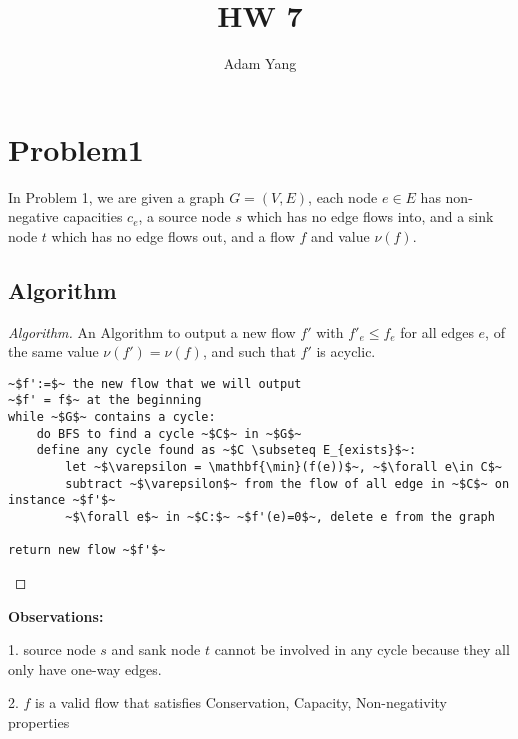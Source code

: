 \documentclass[openany]{article}
\begin{document}
\title{HW 7}
\author{Adam Yang}
\maketitle




\section*{Problem1}

In Problem 1, we are given a graph $G=(V,E)$, each node $e\in E$ has non-negative capacities $c_e$, a source node $s$ which has no edge flows into, and a sink node $t$ which has no edge flows out, and a flow $f$ and value $\nu(f)$.

\subsection*{Algorithm}
\begin{proof}[Algorithm]{}
		\renewcommand{\qedsymbol}{}
		An Algorithm to output a new flow $f'$ with $f'_e \leq f_e$ for all edges $e$, of the same value $\nu(f') = \nu(f)$, and such that $f'$ is acyclic.
		\begin{lstlisting}[basicstyle=\fontsize{8}{9}\selectfont\ttfamily]
~$f':=$~ the new flow that we will output
~$f' = f$~ at the beginning
while ~$G$~ contains a cycle:
    do BFS to find a cycle ~$C$~ in ~$G$~
    define any cycle found as ~$C \subseteq E_{exists}$~:
        let ~$\varepsilon = \mathbf{\min}(f(e))$~, ~$\forall e\in C$~
        subtract ~$\varepsilon$~ from the flow of all edge in ~$C$~ on instance ~$f'$~
        ~$\forall e$~ in ~$C:$~ ~$f'(e)=0$~, delete e from the graph

return new flow ~$f'$~
		\end{lstlisting} 
\end{proof}

\textbf{Observations:}

1. source node $s$ and sank node $t$ cannot be involved in any cycle because they all only have one-way edges.

2. $f$ is a valid flow that satisfies Conservation, Capacity, Non-negativity properties
\end{document}
